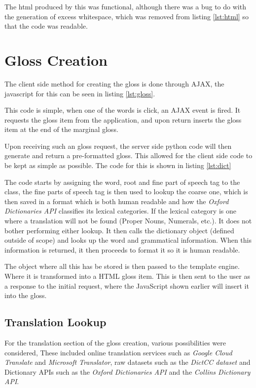 

The html produced by this was functional, although there was a bug to do with the generation of excess whitespace, which was removed from listing \ref{lst:html} so that the code was readable. 

\section{Gloss Creation}

The client side method for creating the gloss is done through AJAX, the javascript for this can be seen in listing \ref{lst:gloss}.



This code is simple, when one of the words is click, an AJAX event is fired. It requests the gloss item from the application, and upon return inserts the gloss item at the end of the marginal gloss.

Upon receiving such an gloss request, the server side python code will then generate and return a pre-formatted gloss. This allowed for the client side code to be kept as simple as possible. The code for this is shown in listing \ref{lst:dict}



The code starts by assigning the word, root and fine part of speech tag to the class, the fine parts of speech tag is then used to lookup the coarse one, which is then saved in a format which is both human readable and how the \textit{Oxford Dictionaries API} classifies its lexical categories.  If the lexical category is one where a translation will not be found (Proper Nouns, Numerals, etc.). It does not bother performing either lookup. It then calls the dictionary object (defined outside of scope) and looks up the word and grammatical information. When this information is returned, it then proceeds to format it so it is human readable.

The object where all this has be stored is then passed to the template engine. Where it is transformed into a HTML gloss item. This is then sent to the user as a response to the initial request, where the JavaScript shown earlier will insert it into the gloss. 

\subsection{Translation Lookup}

For the translation section of the gloss creation, various possibilities were considered, These included online translation services such as \textit{Google Cloud Translate} and \textit{Microsoft Translator}, raw datasets such as the \textit{DictCC dataset} and Dictionary APIs such as the \textit{Oxford Dictionaries API} and the \textit{Collins Dictionary API}. 


